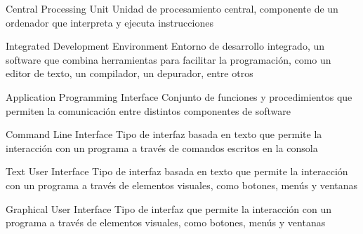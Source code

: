 




{Central Processing Unit}
{Unidad de procesamiento central, componente de un ordenador que interpreta y ejecuta instrucciones}


{Integrated Development Environment}
{Entorno de desarrollo integrado, un software que combina herramientas para facilitar la programación, como un editor de texto, un compilador, un depurador, entre otros}

{Application Programming Interface}
{Conjunto de funciones y procedimientos que permiten la comunicación entre distintos componentes de software}


{Command Line Interface}
{Tipo de interfaz basada en texto que permite la interacción con un programa a través de comandos escritos en la consola}

{Text User Interface}
{Tipo de interfaz basada en texto que permite la interacción con un programa a través de elementos visuales, como botones, menús y ventanas}

{Graphical User Interface}
{Tipo de interfaz que permite la interacción con un programa a través de elementos visuales, como botones, menús y ventanas}

